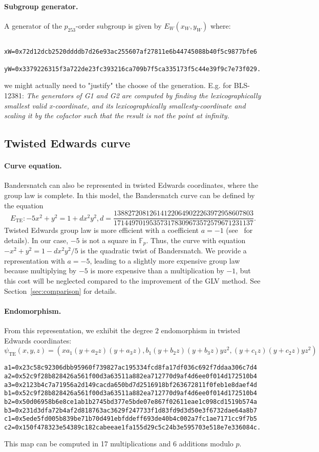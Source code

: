 \documentclass{article}
\newcommand{\AS}[1]{\color{red}#1\color{black}}
\newcommand{\Fp}{\ensuremath{\mathbb F_p}}
\theoremstyle{definition}
\begin{document}
\paragraph{Subgroup generator.}
A generator of the $p_{253}$-order subgroup is given by $E_W(x_W,y_W)$
where:
\begin{verbatim}
  xW=0x72d12dcb2520ddddb7d26e93ac255607af27811e6b44745088b40f5c9877bfe6
  yW=0x3379226315f3a722de23fc393216ca709b7f5ca335173f5c44e39f9c7e73f029.
\end{verbatim}

\AS{we might actually need to "justify" the choose of the generation. E.g. for BLS-12381: \textit{The generators of G1 and G2 are computed by finding the 
lexicographically smallest valid x-coordinate, and its lexicographically smallesty-coordinate and scaling it by the cofactor such that the result is not the point at infinity.}}

\subsection{Twisted Edwards curve}
\paragraph{Curve equation.}
Bandersnatch can also be represented in twisted Edwards coordinates,
where the group law is complete.
In this model, the Bandersnatch curve can be defined by the equation
$$E_\text{TE}:-5x^2+y^2 = 1 +
dx^2y^2, d=\frac{138827208126141220649022263972958607803}{171449701953573178309673572579671231137}.$$
Twisted Edwards group law is more efficient with a coefficient
$a = -1$ (see~\cite{AC:HWCD08} for details).
In our case, $-5$ is not a square in $\Fp$. Thus, the curve with
equation $-x^2+y^2 = 1 -dx^2y^2/5$ is the quadratic twist of
Bandersnatch. We provide a representation with $a=-5$, leading to a
slightly more expensive group law because multiplying by $-5$ is more
expensive than a multiplication by $-1$, but this cost will be
neglected compared to the improvement of the GLV method. See
Section~\ref{sec:comparison} for details.

\paragraph{Endomorphism.}
From this representation, we exhibit the degree $2$ endomorphism in
twisted Edwards coordinates:
$$\psi_\text{TE}(x,y,z) = (xa_1(y+a_2z)(y+a_3z), b_1(y+b_2z)(y+b_3z)yz^2,
(y+c_1z)(y+c_2z)yz^2)$$
\begin{verbatim}
a1=0x23c58c92306dbb95960f739827ac195334fcd8fa17df036c692f7ddaa306c7d4
a2=0x52c9f28b828426a561f00d3a63511a882ea712770d9af4d6ee0f014d172510b4
a3=0x2123b4c7a71956a2d149cacda650bd7d2516918bf263672811f0feb1e8daef4d
b1=0x52c9f28b828426a561f00d3a63511a882ea712770d9af4d6ee0f014d172510b4
b2=0x50d06958b6e8ce1ab1b2745bd377e5bde07e867f02611eae1c098cd1519b574a
b3=0x231d3dfa72b4af2d818763ac3629f247733f1d83fd9d3d50e3f6732dae64a8b7
c1=0x5ede5fd005b839be71b70d491ebfddeff693de40b4c002a7fc1ae7171cc9f7b5
c2=0x150f478323e54389c182cabeeae1fa155d29c5c24b3e595703e518e7e336084c.
\end{verbatim}
This map can be computed in 17 multiplications and 6 additions modulo $p$.
\end{document}
